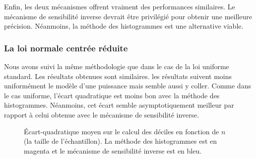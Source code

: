 Enfin, les deux mécanismes offrent vraiment des performances similaires. Le mécanisme de sensibilité inverse devrait être privilégié pour obtenir une meilleure précision. Néanmoins, la méthode des histogrammes est une alternative viable.

\subsubsection{La loi normale centrée réduite}


Nous avons suivi la même méthodologie que dans le cas de la loi uniforme standard. Les résultats obtenues sont similaires. les résultats suivent moins uniformément le modèle d'une puissance mais semble aussi y coller. Comme dans le cas uniforme, l'écart quadratique est moins bon avec la méthode des histogrammes. Néanmoins, cet écart semble asymptotiquement meilleur par rapport à celui obtenue avec le mécanisme de sensibilité inverse. 

\begin{figure}[H]
    \centering
    \hfill
    \hfill
    \caption{Écart-quadratique moyen sur le calcul des déciles en fonction de \(n\) (la taille de l'échantillon). La méthode des histogrammes est en {\color{magenta} magenta} et le mécanisme de sensibilité inverse est en {\color{blue} bleu}.}
\end{figure}




